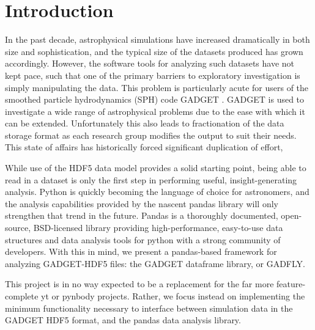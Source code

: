 \section{Introduction}
\label{intro}

In the past decade, astrophysical simulations have increased dramatically in both size and sophistication, and the typical size of the datasets produced has grown accordingly.  
However, the software tools for analyzing such datasets have not kept pace, such that one of the primary barriers to exploratory investigation is simply manipulating the data.  
This problem is particularly acute for users of the smoothed particle hydrodynamics (SPH) code GADGET \citep{Springeletal2005}.  
GADGET is used to investigate a wide range of astrophysical problems due to the ease with which it can be extended.  
Unfortunately this also leads to fractionation of the data storage format as each research group modifies the output to suit their needs.
This state of affairs has historically forced significant duplication of effort, 


While use of the HDF5 data model provides a solid starting point, being able to read in a dataset is only the first step in performing useful, insight-generating analysis.  Python is quickly becoming the language of choice for astronomers, and the analysis capabilities provided by the nascent pandas library will only strengthen that trend in the future.  Pandas is a thoroughly documented, open-source, BSD-licensed library providing high-performance, easy-to-use data structures and data analysis tools for python with a strong community of developers. With this in mind, we present a pandas-based framework for analyzing GADGET-HDF5 files: the GADGET dataframe library, or GADFLY.

This project is in no way expected to be a replacement for the far more feature-complete yt or pynbody projects. Rather, we focus instead on implementing the minimum functionality necessary to interface between simulation data in the GADGET HDF5 format, and the pandas data analysis library.